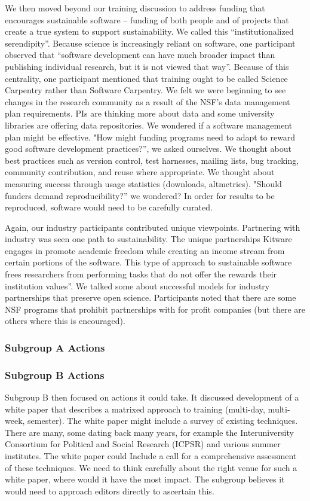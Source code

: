 \documentclass[11pt, oneside]{amsart}
\begin{document}
We then moved beyond our training discussion to address funding that
encourages sustainable software -- funding of both people and of projects
that create a true system to support sustainability. We called this
``institutionalized serendipity''. Because science is increasingly reliant
on software, one participant observed that ``software development can have
much broader impact than publishing individual research, but it is not
viewed that way''. Because of this centrality, one participant mentioned
that training ought to be called Science Carpentry rather than Software
Carpentry. We felt we were beginning to see changes in the research
community as a result of the NSF's data management plan requirements. PIs
are thinking more about data and some university libraries are offering
data repositories. We wondered if a software management plan might be
effective. "How might funding programs need to adapt to reward good
software development practices?'', we asked ourselves. We thought about
best practices such as version control, test harnesses, mailing lists, bug
tracking, community contribution, and reuse where appropriate. We thought
about measuring success through usage statistics (downloads, altmetrics).
"Should funders demand reproducibility?'' we wondered? In order for results
to be reproduced, software would need to be carefully curated.

Again, our industry participants contributed unique viewpoints. Partnering
with industry was seen one path to sustainability. The unique partnerships
Kitware engages in promote academic freedom while creating an income
stream from certain portions of the software. This type of approach to
sustainable software frees researchers from performing tasks that do not
offer the rewards their institution values''. We talked some about
successful models for industry partnerships that preserve open science.
Participants noted that there are some NSF programs that prohibit
partnerships with for profit companies (but there are others where this is
encouraged).


\subsubsection{Subgroup A Actions}

\subsubsection{Subgroup B Actions}

Subgroup B then focused on actions it could take. It discussed development
of a white paper that describes a matrixed approach to training
(multi-day, multi-week, semester). The white paper might include a survey
of existing techniques. There are many, some dating back many years, for
example the Interuniversity Consortium for Political and Social Research
(ICPSR) and various summer institutes. The white paper could Include a
call for a comprehensive assessment of these techniques. We need to think
carefully about the right venue for such a white paper, where would it
have the most impact. The subgroup believes it would need to approach editors
directly to ascertain this.
\end{document}
